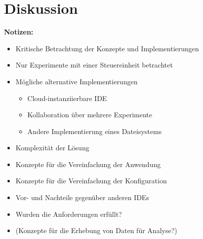 \chapter{Diskussion}\label{section:diskussion}

\begin{note}
    \textbf{Notizen:}
    \begin{itemize}
        \item Kritische Betrachtung der Konzepte und Implementierungen
        \item Nur Experimente mit einer Steuereinheit betrachtet
        \item Mögliche alternative Implementierungen
              \begin{itemize}
                  \item Cloud-instanziierbare IDE
                  \item Kollaboration über mehrere Experimente
                  \item Andere Implementierung eines Dateisystems
              \end{itemize}
        \item Komplexität der Lösung
        \item Konzepte für die Vereinfachung der Anwendung
        \item Konzepte für die Vereinfachung der Konfiguration
        \item Vor- und Nachteile gegenüber anderen IDEs
        \item Wurden die Anforderungen erfüllt?
        \item (Konzepte für die Erhebung von Daten für Analyse?)
    \end{itemize}
\end{note}